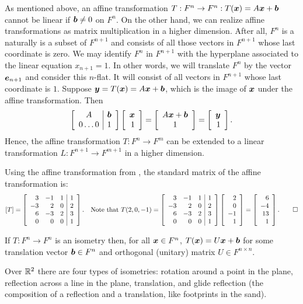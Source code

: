 As mentioned above, an affine transformation $T:F^n\to F^n : T(\bb x) = A\bb x+\bb b$ cannot be linear if $\bb b\neq 0$ on $F^n$. On the other hand, we can realize affine transformations as matrix multiplication in a higher dimension. After all, $F^n$ is a naturally is a subset of $F^{n+1}$ and consists of all those vectors in $F^{n+1}$ whose last coordinate is zero. We may identify $F^n$ in $F^{n+1}$ with the hyperplane associated to the linear equation $x_{n+1}=1$. In other words, we will translate $F^n$ by the vector $\bb e_{n+1}$ and consider this $n$-flat. It will consist of all vectors in $F^{n+1}$ whose last coordinate is $1$. Suppose $\bb y = T(\bb x) = A\bb x+  \bb b$, which is the image of $\bb x$ under the affine transformation. Then 
\[\mtx{c|c}{A & \bb b \\ 0\ldots 0 & 1}\vr{\bb x\\ 1} = \mtx{c}{A\bb x+\bb b \\ 1} = \vr{\bb y\\1}.\] Hence, the affine transformation $T: F^n \to F^m$ can be extended to a linear transformation $L : F^{n+1} \to F^{m+1}$ in a higher dimension. \\

\begin{Exam} Using the affine transformation from , the standard matrix of the affine transformation is:
\[[T] = \mtx{rrr|r}{3&-1&1&1\\-3&2&0&2\\6&-3&2&3\\0&0&0&1}.\quad \text{Note that } T(2,0,-1) = \mtx{rrr|r}{3&-1&1&1\\-3&2&0&2\\6&-3&2&3\\0&0&0&1}\vr{2\\0\\-1\\1} = \vr{6\\-4\\13\\1}.\qedhere \]
\end{Exam}\vs

\begin{Thm} If $T : F^n\to F^n$ is an isometry then, for all $\bb x\in F^n$, $T(\bb x) = U\bb x+\bb b$ for some translation vector $\bb b\in F^n$ and orthogonal (unitary) matrix $U \in F^{n\times n}$.
\end{Thm}\vs

Over $\R^2$ there are four types of isometries: rotation around a point in the plane, reflection across a line in the plane, translation, and glide reflection (the composition of a reflection and a translation, like footprints in the sand).


